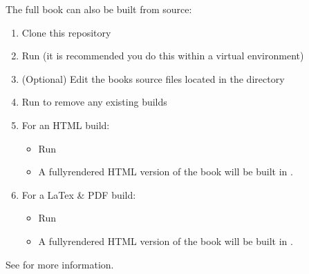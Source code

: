 \documentclass[letterpaper,table,10pt,english]{jupyterBook}
\begin{document}
\sphinxAtStartPar
The full book can also be built from source:
\begin{enumerate}
%
\item {} 
\sphinxAtStartPar
Clone this repository

\item {} 
\sphinxAtStartPar
Run  (it is recommended you do this within a virtual environment)

\item {} 
\sphinxAtStartPar
(Optional) Edit the books source files located in the  directory

\item {} 
\sphinxAtStartPar
Run  to remove any existing builds

\item {} 
\sphinxAtStartPar
For an HTML build:
\begin{itemize}
\item {} 
\sphinxAtStartPar
Run 

\item {} 
\sphinxAtStartPar
A fully\sphinxhyphen{}rendered HTML version of the book will be built in .

\end{itemize}

\item {} 
\sphinxAtStartPar
For a LaTex \& PDF build:
\begin{itemize}
\item {} 
\sphinxAtStartPar
Run 

\item {} 
\sphinxAtStartPar
A fully\sphinxhyphen{}rendered HTML version of the book will be built in .

\end{itemize}

\end{enumerate}

\sphinxAtStartPar
See  for more information.
\end{document}

